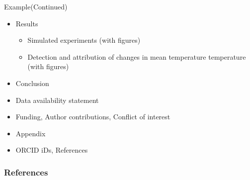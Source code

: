 \documentclass{beamer}
\begin{document}
    
    \begin{frame}{Example(Continued)}
    \begin{itemize}
        \item Results
        \begin{itemize}
            \item Simulated experiments (with figures)
            \item Detection and attribution of changes in mean temperature
    temperature (with figures)
        \end{itemize}
        \item Conclusion
        \item Data availability statement
        \item Funding, Author contributions, Conflict of interest
        \item Appendix
        \item ORCID iDs, References
    \end{itemize} 
    \end{frame}


\begin{frame}
  \frametitle{References}
  
  
\end{frame}
\end{document}
